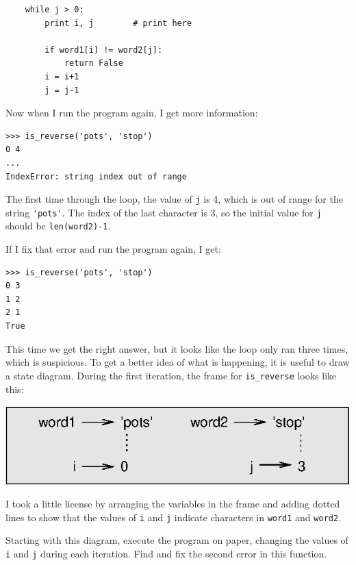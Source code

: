\documentclass[10pt]{book}
\begin{document}
\beforeverb
\begin{verbatim}
    while j > 0:
        print i, j        # print here
        
        if word1[i] != word2[j]:
            return False
        i = i+1
        j = j-1
\end{verbatim}
\afterverb
%
Now when I run the program again, I get more information:

\beforeverb
\begin{verbatim}
>>> is_reverse('pots', 'stop')
0 4
...
IndexError: string index out of range
\end{verbatim}
\afterverb
%
The first time through the loop, the value of {\tt j} is 4,
which is out of range for the string \verb"'pots'".
The index of the last character is 3, so the
initial value for {\tt j} should be {\tt len(word2)-1}.


If I fix that error and run the program again, I get:

\beforeverb
\begin{verbatim}
>>> is_reverse('pots', 'stop')
0 3
1 2
2 1
True
\end{verbatim}
\afterverb
%
This time we get the right answer, but it looks like the loop only ran
three times, which is suspicious.  To get a better idea of what is
happening, it is useful to draw a state diagram.  During the first
iteration, the frame for \verb"is_reverse" looks like this:


\beforefig
\centerline{\includegraphics{figs/state4.eps}}
\afterfig

I took a little license by arranging the variables in the frame
and adding dotted lines to show that the values of {\tt i} and
{\tt j} indicate characters in {\tt word1} and {\tt word2}.

\begin{ex}
\label{is_reverse}
Starting with this diagram, execute the program on paper, changing the
values of {\tt i} and {\tt j} during each iteration.  Find and fix the
second error in this function.
\end{ex}
\end{document}
